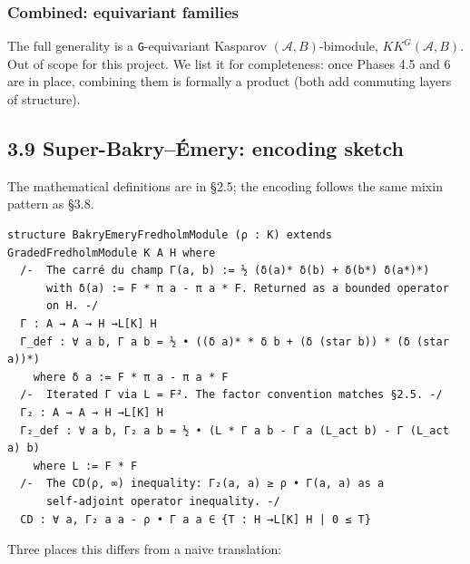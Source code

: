\documentclass[
  11pt,
]{article}
\begin{document}
\subsubsection{Combined: equivariant
families}\label{combined-equivariant-families}

The full generality is a \texttt{G}-equivariant Kasparov
\((\mathcal{A}, B)\)-bimodule, \(KK^G(\mathcal{A}, B)\). Out of scope
for this project. We list it for completeness: once Phases 4.5 and 6 are
in place, combining them is formally a product (both add commuting
layers of structure).

\subsection{3.9 Super-Bakry--Émery: encoding
sketch}\label{super-bakryuxe9mery-encoding-sketch}

The mathematical definitions are in §2.5; the encoding follows the same
mixin pattern as §3.8.

\begin{verbatim}
structure BakryEmeryFredholmModule (ρ : K) extends GradedFredholmModule K A H where
  /-  The carré du champ Γ(a, b) := ½ (δ(a)* δ(b) + δ(b*) δ(a*)*)
      with δ(a) := F * π a - π a * F. Returned as a bounded operator
      on H. -/
  Γ : A → A → H →L[K] H
  Γ_def : ∀ a b, Γ a b = ½ • ((δ a)* * δ b + (δ (star b)) * (δ (star a))*)
    where δ a := F * π a - π a * F
  /-  Iterated Γ via L = F². The factor convention matches §2.5. -/
  Γ₂ : A → A → H →L[K] H
  Γ₂_def : ∀ a b, Γ₂ a b = ½ • (L * Γ a b - Γ a (L_act b) - Γ (L_act a) b)
    where L := F * F
  /-  The CD(ρ, ∞) inequality: Γ₂(a, a) ≥ ρ • Γ(a, a) as a
      self-adjoint operator inequality. -/
  CD : ∀ a, Γ₂ a a - ρ • Γ a a ∈ {T : H →L[K] H | 0 ≤ T}
\end{verbatim}

Three places this differs from a naive translation:
\end{document}
